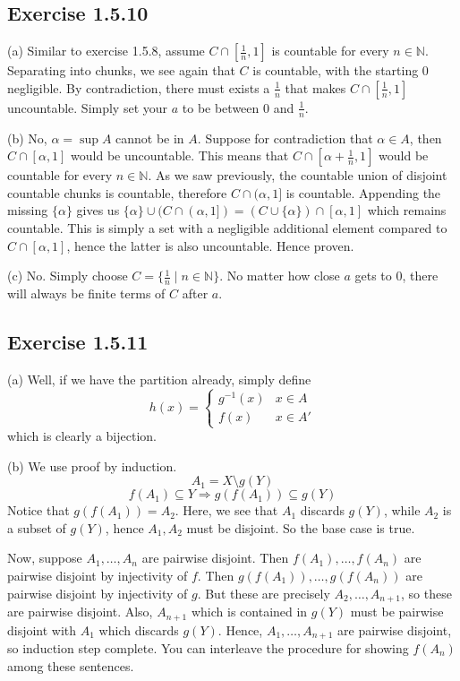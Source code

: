 \documentclass{book}
\begin{document}
\subsection*{Exercise 1.5.10}
(a)
Similar to exercise 1.5.8, assume $C \cap [\frac{1}{n}, 1]$ is countable for every $n \in \mathbb{N}$. Separating into chunks, we see again that $C$ is countable, with the starting $0$ negligible. By contradiction, there must exists a $\frac{1}{n}$ that makes $C \cap [\frac{1}{n}, 1]$ uncountable. Simply set your $a$ to be between $0$ and $\frac{1}{n}$.

\noindent
(b)
No, $\alpha = \sup A$ cannot be in $A$. Suppose for contradiction that $\alpha \in A$, then $C \cap [\alpha, 1]$ would be uncountable. This means that $C \cap [\alpha + \frac{1}{n}, 1]$ would be countable for every $n \in \mathbb{N}$. As we saw previously, the countable union of disjoint countable chunks is countable, therefore $C \cap (\alpha, 1]$ is countable. Appending the missing $\{ \alpha \}$ gives us $\{ \alpha \} \cup (C \cap (\alpha, 1]) = (C \cup \{ \alpha \}) \cap [\alpha, 1]$ which remains countable. This is simply a set with a negligible additional element compared to $C \cap [\alpha, 1]$, hence the latter is also uncountable. Hence proven.

\noindent
(c)
No. Simply choose $C = \{ \frac{1}{n} \mid n \in \mathbb{N} \}$. No matter how close $a$ gets to $0$, there will always be finite terms of $C$ after $a$.

\subsection*{Exercise 1.5.11}
(a)
Well, if we have the partition already, simply define
$$h(x) =
\begin{cases}
    g^{-1}(x) & x \in A \\
    f(x) & x \in A'
\end{cases}$$
which is clearly a bijection.

\noindent
(b)
We use proof by induction.
$$A_1 = X \setminus g(Y)$$
$$f(A_1) \subseteq Y \Rightarrow g(f(A_1)) \subseteq g(Y)$$
Notice that $g(f(A_1)) = A_2$. Here, we see that $A_1$ discards $g(Y)$, while $A_2$ is a subset of $g(Y)$, hence $A_1, A_2$ must be disjoint. So the base case is true.

Now, suppose $A_1, \ldots, A_n$ are pairwise disjoint. Then $f(A_1), \ldots, f(A_n)$ are pairwise disjoint by injectivity of $f$. Then $g(f(A_1)), \ldots, g(f(A_n))$ are pairwise disjoint by injectivity of $g$. But these are precisely $A_2, \ldots, A_{n + 1}$, so these are pairwise disjoint. Also, $A_{n + 1}$ which is contained in $g(Y)$ must be pairwise disjoint with $A_1$ which discards $g(Y)$. Hence, $A_1, \ldots, A_{n + 1}$ are pairwise disjoint, so induction step complete. You can interleave the procedure for showing $f(A_n)$ among these sentences.
\end{document}
